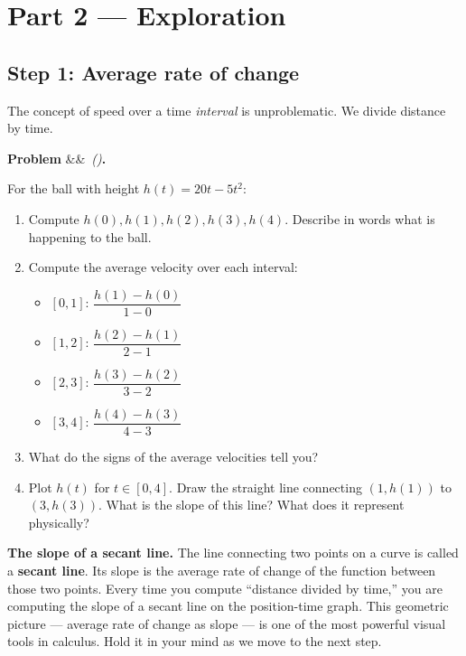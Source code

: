 \documentclass[12pt, a4paper]{article}
\newcounter{problem}
\newenvironment{problem}[1][]{%
  \refstepcounter{problem}%
  \par\vspace{6pt}%
  \noindent\textbf{\color{MidBlue}Problem \theproblem}%
  \ifx&#1&\else\ \textit{(#1)}\fi\textbf{.}\enskip
}{\par\vspace{4pt}}
\begin{document}
\section{Part 2 \texorpdfstring{---}{--} Exploration}

\subsection{Step 1: Average rate of change}

The concept of speed over a time \emph{interval} is unproblematic. We divide distance by time.

\begin{problem}
\label{prob:avg_rate}
For the ball with height $h(t) = 20t - 5t^2$:
\begin{enumerate}[label=(\alph*), topsep=2pt]
  \item Compute $h(0), h(1), h(2), h(3), h(4)$. Describe in words what is happening to the ball.
  \item Compute the average velocity over each interval:
    \begin{itemize}[noitemsep]
      \item $[0, 1]$: $\dfrac{h(1) - h(0)}{1 - 0}$
      \item $[1, 2]$: $\dfrac{h(2) - h(1)}{2 - 1}$
      \item $[2, 3]$: $\dfrac{h(3) - h(2)}{3 - 2}$
      \item $[3, 4]$: $\dfrac{h(4) - h(3)}{4 - 3}$
    \end{itemize}
  \item What do the signs of the average velocities tell you?
  \item Plot $h(t)$ for $t \in [0, 4]$. Draw the straight line connecting $(1, h(1))$ to $(3, h(3))$. What is the slope of this line? What does it represent physically?
\end{enumerate}
\end{problem}

\begin{thought}
\textbf{The slope of a secant line.}
The line connecting two points on a curve is called a \textbf{secant line}. Its slope is the average rate of change of the function between those two points. Every time you compute ``distance divided by time,'' you are computing the slope of a secant line on the position-time graph. This geometric picture --- average rate of change as slope --- is one of the most powerful visual tools in calculus. Hold it in your mind as we move to the next step.
\end{thought}
\end{document}
